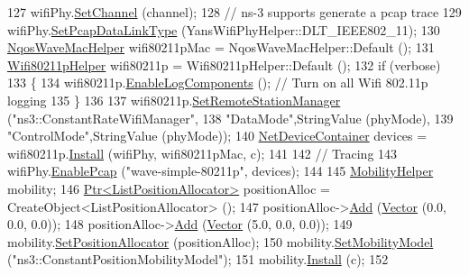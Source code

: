\begin{DoxyCode}
127   wifiPhy.\hyperlink{classns3_1_1YansWifiPhyHelper_ad2e9a27587dd4ff320435c93cc2676de}{SetChannel} (channel);
128   \textcolor{comment}{// ns-3 supports generate a pcap trace}
129   wifiPhy.\hyperlink{classns3_1_1WifiPhyHelper_ae4b90e90f6e78a19c1b7fdf08b270218}{SetPcapDataLinkType} (YansWifiPhyHelper::DLT\_IEEE802\_11);
130   \hyperlink{classns3_1_1NqosWaveMacHelper}{NqosWaveMacHelper} wifi80211pMac = NqosWaveMacHelper::Default ();
131   \hyperlink{classns3_1_1Wifi80211pHelper}{Wifi80211pHelper} wifi80211p = Wifi80211pHelper::Default ();
132   \textcolor{keywordflow}{if} (verbose)
133     \{
134       wifi80211p.\hyperlink{classns3_1_1Wifi80211pHelper_a159fbdfa2402e78aebb00e7042ecfa08}{EnableLogComponents} ();      \textcolor{comment}{// Turn on all Wifi 802.11p logging}
135     \}
136 
137   wifi80211p.\hyperlink{classns3_1_1WifiHelper_a3d01b178aeb2de246ab5a3aa5638ce24}{SetRemoteStationManager} (\textcolor{stringliteral}{"ns3::ConstantRateWifiManager"},
138                                       \textcolor{stringliteral}{"DataMode"},StringValue (phyMode),
139                                       \textcolor{stringliteral}{"ControlMode"},StringValue (phyMode));
140   \hyperlink{classns3_1_1NetDeviceContainer}{NetDeviceContainer} devices = wifi80211p.\hyperlink{classns3_1_1Wifi80211pHelper_a7c72c82947837e274fb09c36dec75d21}{Install} (wifiPhy, wifi80211pMac, c);
141 
142   \textcolor{comment}{// Tracing}
143   wifiPhy.\hyperlink{classns3_1_1PcapHelperForDevice_a74866def9a881aa9d5c5be1225a26722}{EnablePcap} (\textcolor{stringliteral}{"wave-simple-80211p"}, devices);
144 
145   \hyperlink{classns3_1_1MobilityHelper}{MobilityHelper} mobility;
146   \hyperlink{classns3_1_1Ptr}{Ptr<ListPositionAllocator>} positionAlloc = CreateObject<ListPositionAllocator> 
      ();
147   positionAlloc->\hyperlink{classns3_1_1ListPositionAllocator_a460e82f015ac012a73ba0ea0cccb3486}{Add} (\hyperlink{classns3_1_1Vector3D_a7e59b47bc94c9cb1dadff68c1d0112d8}{Vector} (0.0, 0.0, 0.0));
148   positionAlloc->\hyperlink{classns3_1_1ListPositionAllocator_a460e82f015ac012a73ba0ea0cccb3486}{Add} (\hyperlink{classns3_1_1Vector3D_a7e59b47bc94c9cb1dadff68c1d0112d8}{Vector} (5.0, 0.0, 0.0));
149   mobility.\hyperlink{classns3_1_1MobilityHelper_ac59d5295076be3cc11021566713a28c5}{SetPositionAllocator} (positionAlloc);
150   mobility.\hyperlink{classns3_1_1MobilityHelper_a030275011b6f40682e70534d30280aba}{SetMobilityModel} (\textcolor{stringliteral}{"ns3::ConstantPositionMobilityModel"});
151   mobility.\hyperlink{classns3_1_1MobilityHelper_a07737960ee95c0777109cf2994dd97ae}{Install} (c);
152 

\end{DoxyCode}
